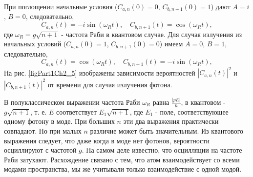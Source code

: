 При поглощении начальные условия ($C_{a,n}\left(0\right) = 0$, $C_{b,n+1}\left(0\right)
= 1$) дают $A = i$, $B = 0$, следовательно,  
\begin{equation}
C_{a,n}\left(t\right) = -i \sin\left(\omega_R t\right), \quad
C_{b, n + 1}\left(t\right) = \cos\left(\omega_R t\right), 
\end{equation}
где $\omega_R = g\sqrt{n + 1}$ - частота Раби в квантовом случае. Для случая
излучения из начальных условий ($C_{a,n}\left(0\right) = 1$,
$C_{b,n+1}\left(0\right) = 0$) имеем $A = 0$, $B = 1$, следовательно, 
\begin{equation}
C_{a,n}\left(t\right) = \cos\left(\omega_R t\right), \quad
C_{b, n + 1}\left(t\right) = -i \sin\left(\omega_R t\right), 
\end{equation}
На рис. \ref{figPart1Ch2_5} изображены зависимости вероятностей 
$\left|C_{a,n}\left(t\right)\right|^2$ и 
$\left|C_{b, n + 1}\left(t\right)\right|^2$  от времени для случая
излучения фотона.



В полуклассическом выражении частота Раби $\omega_R$ равна 
$\frac{\left|p E\right|}{\hbar}$,  в квантовом - $g\sqrt{n + 1}$,
т. е. $E$  соответствует $E_1\sqrt{n + 1}$,  где $E_1$ - поле,
соответствующее одному фотону в моде. При больших $n$ эти два
выражения практически совпадают. Но при малых $n$ различие может быть 
значительным. Из квантового  выражения следует, что даже когда в моде
нет фотонов, вероятности осциллируют с частотой  $g$.  На самом деле 
известно, что осцилляции на частоте Раби затухают. Расхождение связано
с тем, что атом взаимодействует со всеми модами пространства, мы же
учитывали только взаимодействие с одной модой.  

